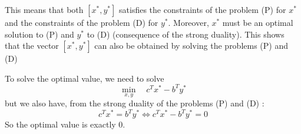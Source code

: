 \documentclass{article}
\begin{document}
\begin{itemize}
        This means that both $[x^*, y^*]$ satisfies the constraints of the problem (P) for $x^*$ and the constraints of the problem (D) for $y^*$. Moreover, $x^*$ must be an optimal solution to (P) and $y^*$ to (D) (consequence of the strong duality). This shows that the vector $[x^*, y^*]$ can also be obtained by solving the problems (P) and (D)

        To solve the optimal value, we need to solve 
        \begin{equation}
            \min_{x,y} \quad c^Tx^*-b^Ty^*
        \end{equation}
        but we also have, from the strong duality of the problems (P) and (D) : 
        \begin{equation}
            c^Tx^*=b^Ty^* \Leftrightarrow c^Tx^*-b^Ty^*=0
        \end{equation}
        So the optimal value is exactly 0.
    \end{itemize}
\end{document}
